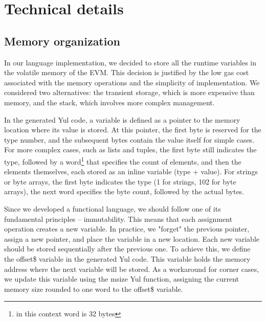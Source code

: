 \section{Technical details}
\label{sec:tech_details}

\subsection{Memory organization}
\label{sec:memory_organization}

In our language implementation, we decided to store all the runtime variables in the volatile memory of the EVM. This decision is justified by the low gas cost associated with the memory operations and the simplicity of implementation. We considered two alternatives: the transient storage, which is more expensive than memory, and the stack, which involves more complex management.

In the generated Yul code, a variable is defined as a pointer to the memory location where its value is stored. At this pointer, the first byte is reserved for the type number, and the subsequent bytes contain the value itself for simple cases. For more complex cases, such as lists and tuples, the first byte still indicates the type, followed by a word\footnote{in this context word is 32 bytes} that specifies the count of elements, and then the elements themselves, each stored as an inline variable (type + value). For strings or byte arrays, the first byte indicates the type (1 for strings, 102 for byte arrays), the next word specifies the byte count, followed by the actual bytes.

Since we developed a functional language, we should follow one of its fundamental principles -- immutability. This means that each assignment operation creates a new variable. In practice, we "forget" the previous pointer, assign a new pointer, and place the variable in a new location. Each new variable should be stored sequentially after the previous one. To achieve this, we define the offset\$ variable in the generated Yul code. This variable holds the memory address where the next variable will be stored. As a workaround for corner cases, we update this variable using the msize Yul function, assigning the current memory size rounded to one word to the offset\$ variable.

